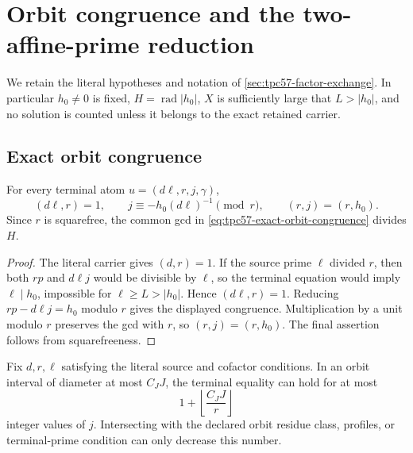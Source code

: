 \section{Orbit congruence and the two-affine-prime reduction}
\label{sec:tpc57-orbit-reduction}

We retain the literal hypotheses and notation of
\cref{sec:tpc57-factor-exchange}.  In particular \(h_0\ne0\) is fixed,
\(H=\operatorname{rad}|h_0|\), \(X\) is sufficiently large that
\(L>|h_0|\), and no solution is counted unless it belongs to the exact
retained carrier.

\subsection{Exact orbit congruence}

\begin{lemma}
\label{lem:tpc57-terminal-gcd}
For every terminal atom \(u=(d\ell,r,j,\gamma)\),
\begin{equation}
 (d\ell,r)=1,
 \qquad
 j\equiv-h_0(d\ell)^{-1}\pmod r,
 \qquad
 \boxed{(r,j)=(r,h_0).}
 \label{eq:tpc57-exact-orbit-congruence}
\end{equation}
Since \(r\) is squarefree, the common gcd in
\eqref{eq:tpc57-exact-orbit-congruence} divides \(H\).
\end{lemma}

\begin{proof}
The literal carrier gives \((d,r)=1\).  If the source prime
\(\ell\) divided \(r\), then both \(rp\) and \(d\ell j\) would be
divisible by \(\ell\), so the terminal equation would imply
\(\ell\mid h_0\), impossible for \(\ell\ge L>|h_0|\).  Hence
\((d\ell,r)=1\).  Reducing
\(rp-d\ell j=h_0\) modulo \(r\) gives the displayed congruence.
Multiplication by a unit modulo \(r\) preserves the gcd with \(r\), so
\((r,j)=(r,h_0)\).  The final assertion follows from squarefreeness.
\end{proof}

\begin{corollary}
\label{cor:tpc57-fixed-row-orbit-sparsity}
Fix \(d,r,\ell\) satisfying the literal source and cofactor conditions.
In an orbit interval of diameter at most \(C_JJ\), the terminal equality
can hold for at most
\begin{equation}
 1+\left\lfloor\frac{C_JJ}{r}\right\rfloor
 \label{eq:tpc57-fixed-row-j-count}
\end{equation}
integer values of \(j\).  Intersecting with the declared orbit residue
class, profiles, or terminal-prime condition can only decrease this
number.
\end{corollary}

